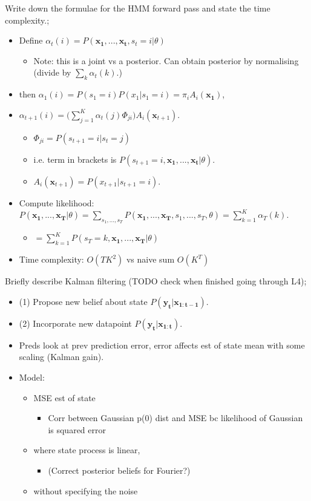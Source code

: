 \documentclass{article}
\begin{document}
Write down the formulae for the HMM forward pass and state the time complexity.; \begin{itemize}
    \item Define $\alpha_t(i)=P(\mathbf{x_1,...,x_t}, s_t=i|\theta)$
    \begin{itemize}
        \item Note: this is a joint vs a posterior. Can obtain posterior by normalising (divide by $\sum_k \alpha_t(k)$.)
    \end{itemize}
    \item then $\alpha_1(i)=P(s_1=i)P(x_1|s_1=i)=\pi_iA_i(\mathbf{x_1})$,
    \item $\alpha_{t+1}(i)=\big(\sum_{j=1}^K\alpha_t(j)\Phi_{ji}\big)A_i(\mathbf{x}_{t+1})$.
    \begin{itemize}
        \item $\Phi_{ji}=P(s_{t+1}=i|s_t=j)$
        \item i.e. term in brackets is $
        P(s_{t+1}=i, \mathbf{x_1,...,x_t}|\theta)$.
        \item $A_i(\mathbf{x}_{t+1})=P(x_{t+1}|s_{t+1}=i)$.
    \end{itemize}
    \item Compute likelihood: $P(\mathbf{x_1,...,x_T}|\theta)=\sum_{s_1,...,s_T}P(\mathbf{x_1,...,x_T}, s_1,...,s_T,\theta)=\sum_{k=1}^K\alpha_T(k)$.
    \begin{itemize}
        \item $=\sum_{k=1}^KP(s_T=k, \mathbf{x_1,...,x_T}|\theta)$
    \end{itemize}
    \item Time complexity: $O(TK^2)$ vs naive sum $O(K^T)$
\end{itemize}

Briefly describe Kalman filtering (TODO check when finished going through L4); \begin{itemize}
    \item (1) Propose new belief about state $P(\mathbf{y_t|x_{1:t-1}})$.
        \item (2) Incorporate new datapoint $P(\mathbf{y_t|x_{1:t}})$.
        \item Preds look at prev prediction error, error affects est of state mean with some scaling (Kalman gain).
    \item Model:
    \begin{itemize}
        \item MSE est of state 
    \begin{itemize}
        \item Corr between Gaussian p(0) dist and MSE bc likelihood of Gaussian is squared error
    \end{itemize}
    \item where state process is linear, 
    \begin{itemize}
        \item (Correct posterior beliefs for Fourier?)
    \end{itemize}
    \item without specifying the noise
    \end{itemize}
    
\end{itemize}
\end{document}
